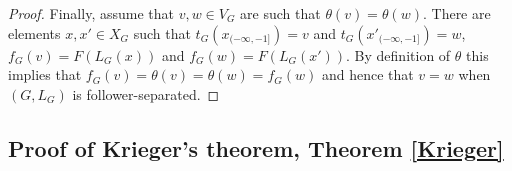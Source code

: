 \documentclass[12pt,oneside,english]{amsart}
\begin{document}
\begin{proof}

Finally, assume that $v,w \in V_G$ are such that $\theta(v) =\theta(w)$. There are elements $x,x' \in X_G$ such that $t_G(x_{(-\infty,-1]}) = v$ and $t_G(x'_{(-\infty,-1]}) = w$, $f_{G}(v) = F(L_G(x))$ and $f_G(w) = F(L_G(x'))$. By definition of $\theta$ this implies that $f_G(v) = \theta(v) = \theta(w) = f_G(w)$ and hence that $v=w$ when $(G,L_G)$ is follower-separated.
\end{proof}


\subsection{Proof of Krieger's theorem, Theorem \ref{Krieger}}
\end{document}
